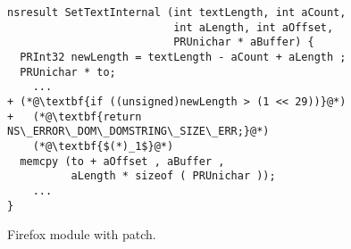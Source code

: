 \begin{figure}
\centering
\begin{lstlisting}
nsresult SetTextInternal (int textLength, int aCount,
                          int aLength, int aOffset,
                          PRUnichar * aBuffer) {
  PRInt32 newLength = textLength - aCount + aLength ;
  PRUnichar * to;
    ...
+ (*@\textbf{if ((unsigned)newLength > (1 << 29))}@*)
+   (*@\textbf{return NS\_ERROR\_DOM\_DOMSTRING\_SIZE\_ERR;}@*)
    (*@\textbf{$(*)_1$}@*)
  memcpy (to + aOffset , aBuffer ,
          aLength * sizeof ( PRUnichar ));
    ...
}
\end{lstlisting}
%
\caption{Firefox  module with patch.}
\end{figure} 